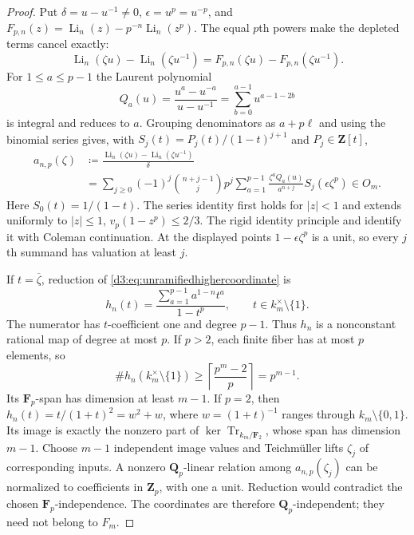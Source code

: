\documentclass[11pt,a4paper]{amsart}
\numberwithin{equation}{section}
\theoremstyle{definition}
\theoremstyle{remark}
\newcommand{\Q}{\mathbf Q}
\newcommand{\Z}{\mathbf Z}
\newcommand{\F}{\mathbf F}
\begin{document}
\begin{proof}
Put $\delta=u-u^{-1}\ne0$, $\epsilon=u^p=u^{-p}$, and
$F_{p,n}(z)=\operatorname{Li}_n(z)-p^{-n}\operatorname{Li}_n(z^p)$.
The equal $p$th powers make the depleted terms cancel exactly:
\[
 \operatorname{Li}_n(\zeta u)-\operatorname{Li}_n(\zeta u^{-1})
 =F_{p,n}(\zeta u)-F_{p,n}(\zeta u^{-1}).
\]
For $1\leq a\leq p-1$ the Laurent polynomial
\[
 Q_a(u)=\frac{u^a-u^{-a}}{u-u^{-1}}
       =\sum_{b=0}^{a-1}u^{a-1-2b}
\]
is integral and reduces to $a$.
Grouping denominators as $a+p\ell$ and using the binomial series
gives, with $S_j(t)=P_j(t)/(1-t)^{j+1}$ and $P_j\in\Z[t]$,
\begin{equation}\label{d3:eq:unramifiedhighercoordinate}
\begin{split}
 a_{n,p}(\zeta)
 &\coloneqq\frac{\operatorname{Li}_n(\zeta u)
                   -\operatorname{Li}_n(\zeta u^{-1})}{\delta}\\
 &=\sum_{j\geq0}(-1)^j\binom{n+j-1}{j}p^j
       \sum_{a=1}^{p-1}\frac{\zeta^aQ_a(u)}{a^{n+j}}
                              S_j(\epsilon\zeta^p)\in O_m.
\end{split}
\end{equation}
Here $S_0(t)=1/(1-t)$.
The series identity first holds for $|z|<1$ and extends uniformly
to $|z|\leq1$, $v_p(1-z^p)\leq2/3$.
The rigid identity principle and
\cite[Theorem~2.7(3)]{BesserDeJeuAlgorithm} identify it with Coleman
continuation. At the displayed points $1-\epsilon\zeta^p$ is a unit,
so every $j$th summand has valuation at least $j$.

If $t=\overline\zeta$, reduction of
\eqref{d3:eq:unramifiedhighercoordinate} is
\[
 h_n(t)=\frac{\sum_{a=1}^{p-1}a^{1-n}t^a}{1-t^p},
 \qquad t\in k_m^\times\setminus\{1\}.
\]
The numerator has $t$-coefficient one and degree $p-1$.
Thus $h_n$ is a nonconstant rational map of degree at most $p$.
If $p>2$, each finite fiber has at most $p$ elements, so
\[
 \#h_n(k_m^\times\setminus\{1\})
 \geq\left\lceil\frac{p^m-2}{p}\right\rceil=p^{m-1}.
\]
Its $\F_p$-span has dimension at least $m-1$.
If $p=2$, then $h_n(t)=t/(1+t)^2=w^2+w$, where
$w=(1+t)^{-1}$ ranges through $k_m\setminus\{0,1\}$.
Its image is exactly the nonzero part of
$\ker\operatorname{Tr}_{k_m/\F_2}$, whose span has dimension $m-1$.
Choose $m-1$ independent image values and Teichm\"uller lifts
$\zeta_j$ of corresponding inputs.
A nonzero $\Q_p$-linear relation among $a_{n,p}(\zeta_j)$ can
be normalized to coefficients in $\Z_p$, with one a unit.
Reduction would contradict the chosen $\F_p$-independence.
The coordinates are therefore $\Q_p$-independent; they need not
belong to $F_m$.


\end{proof}
\end{document}
